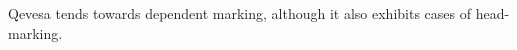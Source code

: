 \documentclass[grammar]{subfiles}
\begin{document}
	Qevesa tends towards dependent marking, although it also exhibits cases of head-marking.

	\ToBeWritten

	











\end{document}
